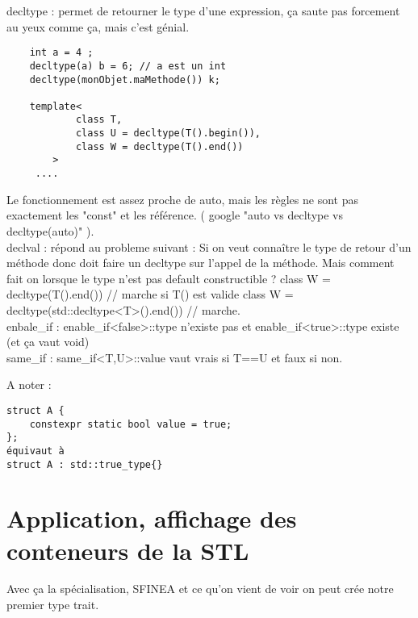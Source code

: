 \documentclass[a4paper, 11pt]{article}
\begin{document}
decltype : permet de retourner le type d'une expression, ça saute pas forcement au yeux comme ça, mais c'est génial.
\begin{lstlisting}
	int a = 4 ;
	decltype(a) b = 6; // a est un int
	decltype(monObjet.maMethode()) k; 

	template<
            class T,
            class U = decltype(T().begin()),
            class W = decltype(T().end())
        >
     .... 
\end{lstlisting}
Le fonctionnement est assez proche de auto, mais les règles ne sont pas exactement les "const" et les référence. ( google "auto vs decltype vs decltype(auto)" ). \\


declval : répond au probleme suivant : Si on veut connaître le type de retour d'un méthode donc doit faire un decltype sur l'appel de la méthode. Mais comment fait on lorsque le type n'est pas default constructible ? 
class W = decltype(T().end()) // marche si T() est valide
class W = decltype(std::decltype<T>().end()) // marche.
\\
enbale\_if : enable\_if<false>::type n'existe pas et enable\_if<true>::type existe (et ça vaut void)
\\ 
same\_if : same\_if<T,U>::value vaut vrais si T==U et faux si non.

A noter : 
\begin{lstlisting}
struct A { 
	constexpr static bool value = true;
};
équivaut à 
struct A : std::true_type{}
\end{lstlisting}

\section{Application, affichage des conteneurs de la STL}
Avec ça la spécialisation, SFINEA et ce qu'on vient de voir on peut crée notre premier type trait. 
\end{document}
